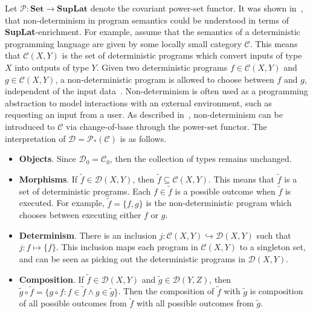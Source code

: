 \begin{exa}
    Let $\mathcal{P}: \mathbf{Set} \to \mathbf{SupLat}$ denote the covariant power-set functor.
    It was shown in~\cite{Little2025}, that non-determinism in program semantics could be understood in terms of \textbf{SupLat}-enrichment.
    For example, assume that the semantics of a deterministic programming language are given by some locally small category $\mathcal{C}$.
    This means that $\mathcal{C}( X, Y )$ is the set of deterministic programs which convert inputs of type $X$ into outputs of type $Y$.
    Given two deterministic programs $f \in \mathcal{C}( X, Y )$ and $g \in \mathcal{C}( X, Y )$, a non-deterministic program is allowed to choose between $f$ and $g$, independent of the input data~\cite{10.1145/321420.321422}.
    Non-determinism is often used as a programming abstraction to model interactions with an external environment, such as requesting an input from a user.
    As described in~\cite{Little2025}, non-determinism can be introduced to $\mathcal{C}$ via change-of-base through the power-set functor.
    The interpretation of $\mathcal{D} = \mathcal{P}_*( \mathcal{C} )$ is as follows.
    \begin{itemize}
    \item \textbf{Objects}.
          Since $\mathcal{D}_0 = \mathcal{C}_0$, then the collection of types remains unchanged.
    \item \textbf{Morphisms}.
          If $\widetilde{f} \in \mathcal{D}( X, Y )$, then $\widetilde{f} \subseteq \mathcal{C}( X, Y )$.
          This means that $\widetilde{f}$ is a set of deterministic programs.
          Each $f \in \widetilde{f}$ is a possible outcome when $\widetilde{f}$ is executed.
          For example, $\widetilde{f} = \{ f, g \}$ is the non-deterministic program which chooses between executing either $f$ or $g$.
    \item \textbf{Determinism}.
          There is an inclusion $j: \mathcal{C}( X, Y ) \hookrightarrow \mathcal{D}( X, Y )$ such that $j: f \mapsto \{ f \}$.
          This inclusion maps each program in $\mathcal{C}( X, Y )$ to a singleton set, and can be seen as picking out the deterministic programs in $\mathcal{D}( X, Y )$.
    \item \textbf{Composition}.
          If $\widetilde{f} \in \mathcal{D}( X, Y )$ and $\widetilde{g} \in \mathcal{D}( Y, Z )$, then $\widetilde{g} \circ \widetilde{f} = \{ g \circ f : f \in \widetilde{f} \land g \in \widetilde{g} \}$.
          Then the composition of $\widetilde{f}$ with $\widetilde{g}$ is composition of all possible outcomes from $\widetilde{f}$ with all possible outcomes from $\widetilde{g}$.

\end{itemize}
\end{exa}

